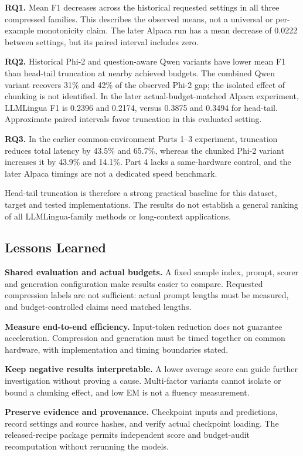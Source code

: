 ﻿\documentclass[10pt,a4paper,twocolumn]{article}
\begin{document}
\textbf{RQ1.} Mean F1 decreases across the historical requested settings in all
three compressed families. This describes the observed means, not a universal or
per-example monotonicity claim. The later Alpaca run has a mean decrease of
0.0222 between settings, but its paired interval includes zero.

\textbf{RQ2.} Historical Phi-2 and question-aware Qwen variants have lower mean
F1 than head-tail truncation at nearby achieved budgets. The combined Qwen
variant recovers 31\% and 42\% of the observed Phi-2 gap; the isolated effect of
chunking is not identified. In the later actual-budget-matched Alpaca experiment,
LLMLingua F1 is 0.2396 and 0.2174, versus 0.3875 and 0.3494 for head-tail.
Approximate paired intervals favor truncation in this evaluated setting.

\textbf{RQ3.} In the earlier common-environment Parts 1--3 experiment,
truncation reduces total latency by 43.5\% and 65.7\%, whereas the chunked
Phi-2 variant increases it by 43.9\% and 14.1\%. Part 4 lacks a same-hardware
control, and the later Alpaca timings are not a dedicated speed benchmark.

Head-tail truncation is therefore a strong practical baseline for this dataset,
target and tested implementations. The results do not establish a general ranking
of all LLMLingua-family methods or long-context applications.

\subsection{Lessons Learned}
\label{sec:lessons}

\textbf{Shared evaluation and actual budgets.} A fixed sample index, prompt,
scorer and generation configuration make results easier to compare. Requested
compression labels are not sufficient: actual prompt lengths must be measured,
and budget-controlled claims need matched lengths.

\textbf{Measure end-to-end efficiency.} Input-token reduction does not guarantee
acceleration. Compression and generation must be timed together on common
hardware, with implementation and timing boundaries stated.

\textbf{Keep negative results interpretable.} A lower average score can guide
further investigation without proving a cause. Multi-factor variants cannot
isolate or bound a chunking effect, and low EM is not a fluency measurement.

\textbf{Preserve evidence and provenance.} Checkpoint inputs and predictions,
record settings and source hashes, and verify actual checkpoint loading. The
released-recipe package permits independent score and budget-audit recomputation
without rerunning the models.
\end{document}
